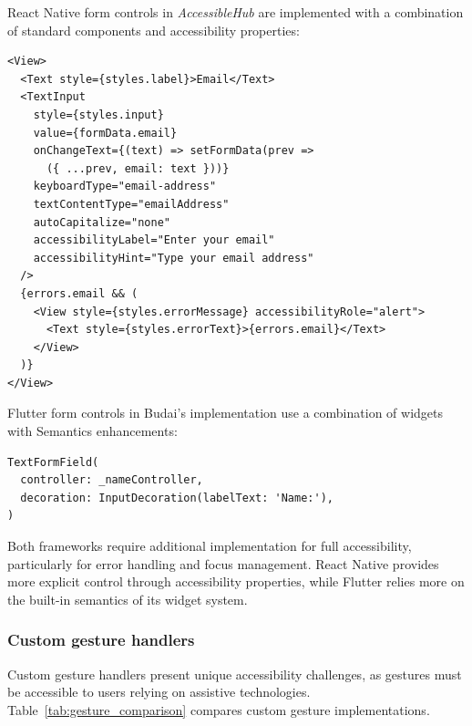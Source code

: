 React Native form controls in \textit{AccessibleHub} are implemented with a combination of standard components and accessibility properties:

\begin{lstlisting}[style=ReactNativeStyle, caption=React Native form control implementation, label=lst:rn-form]
<View>
  <Text style={styles.label}>Email</Text>
  <TextInput
    style={styles.input}
    value={formData.email}
    onChangeText={(text) => setFormData(prev => 
      ({ ...prev, email: text }))}
    keyboardType="email-address"
    textContentType="emailAddress"
    autoCapitalize="none"
    accessibilityLabel="Enter your email"
    accessibilityHint="Type your email address"
  />
  {errors.email && (
    <View style={styles.errorMessage} accessibilityRole="alert">
      <Text style={styles.errorText}>{errors.email}</Text>
    </View>
  )}
</View>
\end{lstlisting}

Flutter form controls in Budai's implementation use a combination of widgets with Semantics enhancements:

\begin{lstlisting}[style=DartStyle, caption=Flutter form control implementation, label=lst:flutter-form]
TextFormField(
  controller: _nameController,
  decoration: InputDecoration(labelText: 'Name:'),
)
\end{lstlisting}

Both frameworks require additional implementation for full accessibility, particularly for error handling and focus management. React Native provides more explicit control through accessibility properties, while Flutter relies more on the built-in semantics of its widget system.

\subsubsection{Custom gesture handlers}
\label{subsubsec:custom-gestures}

Custom gesture handlers present unique accessibility challenges, as gestures must be accessible to users relying on assistive technologies. Table~\ref{tab:gesture_comparison} compares custom gesture implementations.

